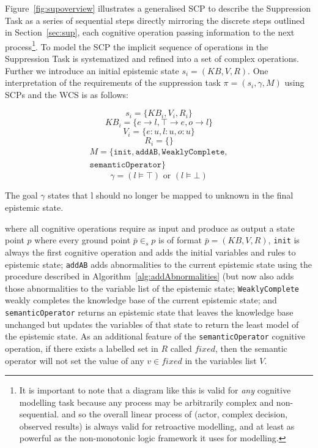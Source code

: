 \documentclass{article}
\begin{document}
Figure~\ref{fig:supoverview} illustrates a generalised SCP to describe the Suppression Task as a series of sequential steps directly mirroring the discrete steps outlined in Section~\ref{sec:sup}, each cognitive operation passing information to the next process\footnote{It is important to note that a diagram like this is valid for \textit{any} cognitive modelling task because any process may be arbitrarily complex and non-sequential. and so the overall linear process of (actor, complex decision, observed results) is always valid for retroactive modelling, and at least as powerful as the non-monotonic logic framework it uses for modelling.}. To model the SCP the implicit sequence of operations in the Suppression Task is systematized and refined into a set of complex operations. Further we introduce an initial epistemic state $s_i=(KB,V,R)$. One interpretation of the requirements of the suppression task $\pi=(s_i,\gamma,M)$ using SCPs and the WCS is as follows: 
 
 
 
 


\[s_i=\{KB_i, V_i, R_i\} \]
\[KB_i=\{e \rightarrow l, \top \rightarrow e, o \rightarrow l\} \]
\[V_i=\{e:u, l:u, o:u\} \]
\[R_i=\{\} \]
\[
\begin{split}
M= \{\texttt{init}, \texttt{addAB}, \texttt{WeaklyComplete},
\\ \texttt{semanticOperator}\}
\end{split}
\]
\[\gamma = (l\models \top) \textrm{ or } (l \models \bot)\]

The goal $\gamma$ states that l should no longer be mapped to unknown in the final epistemic state.

where all cognitive operations require as input and produce as output a state point $p$ where every ground point $\bar{p} \in_s p$ is of format $\bar{p}=(KB,V,R)$, \texttt{init} is always the first cognitive operation and adds the initial variables and rules to epistemic state; \texttt{addAB} adds abnormalities to the current epistemic state using the procedure described in Algorithm~\ref{alg:addAbnormalities} (but now also adds those abnormalities to the variable list of the epistemic state; \texttt{WeaklyComplete} weakly completes the knowledge base of the current epistemic state; and \texttt{semanticOperator} returns an epistemic state that leaves the knowledge base unchanged but updates the variables of that state to return the least model of the epistemic state. As an additional feature of the \texttt{semanticOperator} cognitive operation, if there exists a labelled set in $R$ called $fixed$, then the semantic operator will not set the value of any $v \in fixed$ in the variables list $V$.
\end{document}
